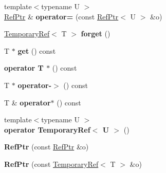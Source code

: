 \begin{DoxyCompactItemize}
\item 
\hypertarget{classmozilla_1_1_ref_ptr_a9aac21669a2e040834d4e69812b0d0bb}{{\footnotesize template$<$typename U $>$ }\\\hyperlink{classmozilla_1_1_ref_ptr}{Ref\-Ptr} \& {\bfseries operator=} (const \hyperlink{classmozilla_1_1_ref_ptr}{Ref\-Ptr}$<$ U $>$ \&o)}\label{classmozilla_1_1_ref_ptr_a9aac21669a2e040834d4e69812b0d0bb}

\item 
\hypertarget{classmozilla_1_1_ref_ptr_ada0259c09825f15879bc9a062d298d43}{\hyperlink{classmozilla_1_1_temporary_ref}{Temporary\-Ref}$<$ T $>$ {\bfseries forget} ()}\label{classmozilla_1_1_ref_ptr_ada0259c09825f15879bc9a062d298d43}

\item 
\hypertarget{classmozilla_1_1_ref_ptr_aabc2911118bb03e4ed92bed41f76b33f}{T $\ast$ {\bfseries get} () const }\label{classmozilla_1_1_ref_ptr_aabc2911118bb03e4ed92bed41f76b33f}

\item 
\hypertarget{classmozilla_1_1_ref_ptr_a5d55f3566ea2889e53ed218879a30955}{{\bfseries operator T $\ast$} () const }\label{classmozilla_1_1_ref_ptr_a5d55f3566ea2889e53ed218879a30955}

\item 
\hypertarget{classmozilla_1_1_ref_ptr_a604d6e63089a0d8ba820ba7d004af3c9}{T $\ast$ {\bfseries operator-\/$>$} () const }\label{classmozilla_1_1_ref_ptr_a604d6e63089a0d8ba820ba7d004af3c9}

\item 
\hypertarget{classmozilla_1_1_ref_ptr_a1b2ce0119e31a55423dda6f6759229d0}{T \& {\bfseries operator$\ast$} () const }\label{classmozilla_1_1_ref_ptr_a1b2ce0119e31a55423dda6f6759229d0}

\item 
\hypertarget{classmozilla_1_1_ref_ptr_a6c8827d3a36d383b4d1d8ebb1a735bdb}{{\footnotesize template$<$typename U $>$ }\\{\bfseries operator Temporary\-Ref$<$ U $>$} ()}\label{classmozilla_1_1_ref_ptr_a6c8827d3a36d383b4d1d8ebb1a735bdb}

\item 
\hypertarget{classmozilla_1_1_ref_ptr_ae72d21fda9ad3f180d6c8a709e08058d}{{\bfseries Ref\-Ptr} (const \hyperlink{classmozilla_1_1_ref_ptr}{Ref\-Ptr} \&o)}\label{classmozilla_1_1_ref_ptr_ae72d21fda9ad3f180d6c8a709e08058d}

\item 
\hypertarget{classmozilla_1_1_ref_ptr_aab46f6e9d3f998e733e22c731ee514c5}{{\bfseries Ref\-Ptr} (const \hyperlink{classmozilla_1_1_temporary_ref}{Temporary\-Ref}$<$ T $>$ \&o)}\label{classmozilla_1_1_ref_ptr_aab46f6e9d3f998e733e22c731ee514c5}


\end{DoxyCompactItemize}
